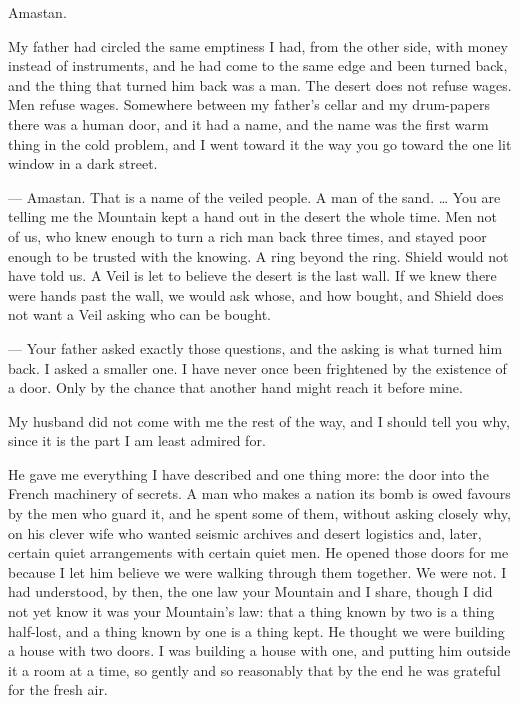Amastan.\par

My father had circled the same emptiness I had, from the other side, with money instead of instruments, and he had come to the same edge and been turned back, and the thing that turned him back was a man. The desert does not refuse wages. Men refuse wages. Somewhere between my father's cellar and my drum-papers there was a human door, and it had a name, and the name was the first warm thing in the cold problem, and I went toward it the way you go toward the one lit window in a dark street.\par

\begin{room}

--- Amastan. That is a name of the veiled people. A man of the sand. \ldots{} You are telling me the Mountain kept a hand out in the desert the whole time. Men not of us, who knew enough to turn a rich man back three times, and stayed poor enough to be trusted with the knowing. A ring beyond the ring. Shield would not have told us. A Veil is let to believe the desert is the last wall. If we knew there were hands past the wall, we would ask whose, and how bought, and Shield does not want a Veil asking who can be bought.

--- Your father asked exactly those questions, and the asking is what turned him back. I asked a smaller one. I have never once been frightened by the existence of a door. Only by the chance that another hand might reach it before mine.

\end{room}

My husband did not come with me the rest of the way, and I should tell you why, since it is the part I am least admired for.\par

He gave me everything I have described and one thing more: the door into the French machinery of secrets. A man who makes a nation its bomb is owed favours by the men who guard it, and he spent some of them, without asking closely why, on his clever wife who wanted seismic archives and desert logistics and, later, certain quiet arrangements with certain quiet men. He opened those doors for me because I let him believe we were walking through them together. We were not. I had understood, by then, the one law your Mountain and I share, though I did not yet know it was your Mountain's law: that a thing known by two is a thing half-lost, and a thing known by one is a thing kept. He thought we were building a house with two doors. I was building a house with one, and putting him outside it a room at a time, so gently and so reasonably that by the end he was grateful for the fresh air.\par

